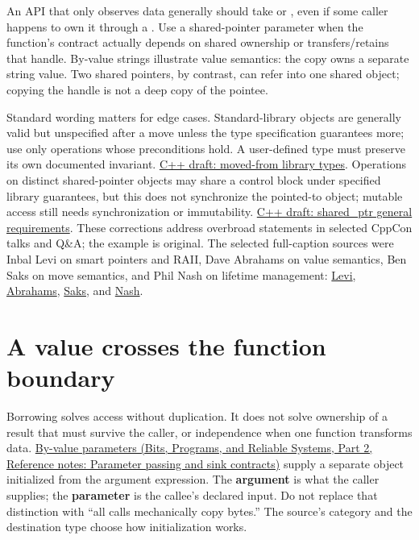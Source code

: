 An API that only observes data generally should take  or , even if some caller happens to own it through a . Use a shared-pointer parameter when the function's contract actually depends on shared ownership or transfers/retains that handle. By-value strings illustrate value semantics: the copy owns a separate string value. Two shared pointers, by contrast, can refer into one shared object; copying the handle is not a deep copy of the pointee.

Standard wording matters for edge cases. Standard-library objects are generally valid but unspecified after a move unless the type specification guarantees more; use only operations whose preconditions hold. A user-defined type must preserve its own documented invariant. \href{https://eel.is/c++draft/lib.types.movedfrom}{C++ draft: moved-from library types}. Operations on distinct shared-pointer objects may share a control block under specified library guarantees, but this does not synchronize the pointed-to object; mutable access still needs synchronization or immutability. \href{https://eel.is/c++draft/util.smartptr.shared}{C++ draft: shared\_ptr general requirements}. These corrections address overbroad statements in selected CppCon talks and Q\&A; the example is original. The selected full-caption sources were Inbal Levi on smart pointers and RAII, Dave Abrahams on value semantics, Ben Saks on move semantics, and Phil Nash on lifetime management: \href{https://www.youtube.com/watch?v=07rJOzFRs6M}{Levi}, \href{https://www.youtube.com/watch?v=QthAU-t3PQ4}{Abrahams}, \href{https://www.youtube.com/watch?v=szU5b972F7E}{Saks}, and \href{https://www.youtube.com/watch?v=aMvIv6blzBs}{Nash}.

\section{A value crosses the function boundary}\label{05-engine-i-ch003-a-value-crosses-the-function-boundary}

\hypertarget{05-engine-i-ch003-a-value-crosses-the-function-boundary}{}

Borrowing solves access without duplication. It does not solve ownership of a result that must survive the caller, or independence when one function transforms data. \href{../01-Bits-Programs-and-Reliable-Systems-P02/main.pdf\#nameddest=appendix-d5908f75721f}{By-value parameters (Bits, Programs, and Reliable Systems, Part 2, Reference notes: Parameter passing and sink contracts)} supply a separate object initialized from the argument expression. The \textbf{argument} is what the caller supplies; the \textbf{parameter} is the callee's declared input. Do not replace that distinction with ``all calls mechanically copy bytes.'' The source's category and the destination type choose how initialization works.


